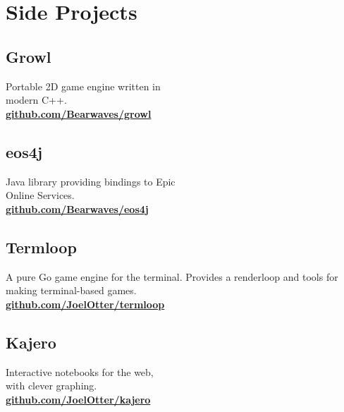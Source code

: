 \documentclass[]{deedy-resume-openfont}
\begin{document}
\begin{minipage}[t]{0.33\textwidth}

\section{Side Projects}
\subsection{Growl}
Portable 2D game engine written in\\modern C++.\\
\href{http://github.com/Bearwaves/growl}{\bf{github.com/Bearwaves/growl}}
\sectionsep
\subsection{eos4j}
Java library providing bindings to Epic\\Online Services.\\
\href{http://github.com/Bearwaves/eos4j}{\bf{github.com/Bearwaves/eos4j}}
\sectionsep
\subsection{Termloop}
A pure Go game engine for the terminal. Provides a renderloop and tools for making terminal-based games.\\
\href{http://github.com/JoelOtter/termloop}{\bf{github.com/JoelOtter/termloop}}
\sectionsep
\subsection{Kajero}
Interactive notebooks for the web,\\with clever graphing.\\
\href{http://github.com/JoelOtter/kajero}{\bf{github.com/JoelOtter/kajero}}
\sectionsep

%
%

\end{minipage} 
\hfill
\end{document}
